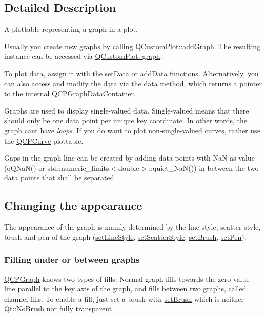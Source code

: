 \subsection{Detailed Description}
A plottable representing a graph in a plot. 



Usually you create new graphs by calling \hyperlink{classQCustomPlot_a6fb2873d35a8a8089842d81a70a54167}{Q\+Custom\+Plot\+::add\+Graph}. The resulting instance can be accessed via \hyperlink{classQCustomPlot_a6d3ed93c2bf46ab7fa670d66be4cddaf}{Q\+Custom\+Plot\+::graph}.

To plot data, assign it with the \hyperlink{classQCPGraph_a1eae9429a316b008e2d99b2d65a54395}{set\+Data} or \hyperlink{classQCPGraph_ae0555c0d3fe0fa7cb8628f88158d420f}{add\+Data} functions. Alternatively, you can also access and modify the data via the \hyperlink{classQCPGraph_a04514a2b1fb61a280ead66abe80b89ab}{data} method, which returns a pointer to the internal Q\+C\+P\+Graph\+Data\+Container.

Graphs are used to display single-\/valued data. Single-\/valued means that there should only be one data point per unique key coordinate. In other words, the graph can\textquotesingle{}t have {\itshape loops}. If you do want to plot non-\/single-\/valued curves, rather use the \hyperlink{classQCPCurve}{Q\+C\+P\+Curve} plottable.

Gaps in the graph line can be created by adding data points with NaN as value ({\ttfamily q\+Q\+Na\+N()} or {\ttfamily std\+::numeric\+\_\+limits$<$double$>$\+::quiet\+\_\+\+Na\+N()}) in between the two data points that shall be separated.\hypertarget{classQCPGraph_qcpgraph-appearance}{}\subsection{Changing the appearance}\label{classQCPGraph_qcpgraph-appearance}
The appearance of the graph is mainly determined by the line style, scatter style, brush and pen of the graph (\hyperlink{classQCPGraph_a513fecccff5b2a50ce53f665338c60ff}{set\+Line\+Style}, \hyperlink{classQCPGraph_a12bd17a8ba21983163ec5d8f42a9fea5}{set\+Scatter\+Style}, \hyperlink{classQCPAbstractPlottable_a7a4b92144dca6453a1f0f210e27edc74}{set\+Brush}, \hyperlink{classQCPAbstractPlottable_ab74b09ae4c0e7e13142fe4b5bf46cac7}{set\+Pen}).\hypertarget{classQCPGraph_filling}{}\subsubsection{Filling under or between graphs}\label{classQCPGraph_filling}
\hyperlink{classQCPGraph}{Q\+C\+P\+Graph} knows two types of fills\+: Normal graph fills towards the zero-\/value-\/line parallel to the key axis of the graph, and fills between two graphs, called channel fills. To enable a fill, just set a brush with \hyperlink{classQCPAbstractPlottable_a7a4b92144dca6453a1f0f210e27edc74}{set\+Brush} which is neither Qt\+::\+No\+Brush nor fully transparent.

